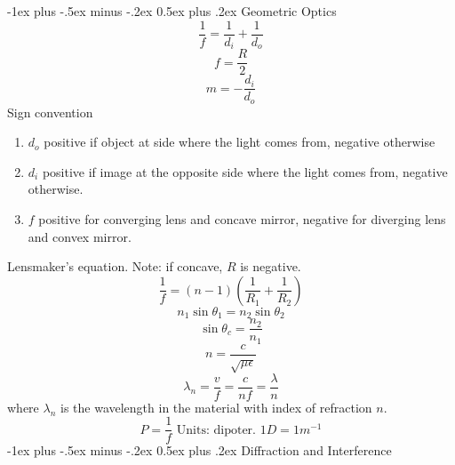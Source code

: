 \documentclass[12pt,landscape]{article}
\makeatletter
\renewcommand{\section}{\@startsection{section}{1}{0mm}%
                                {-1ex plus -.5ex minus -.2ex}%
                                {0.5ex plus .2ex}%
                                {\normalfont\large\bfseries}}
\makeatother
\begin{document}
\begin{multicols}{4}
    \newpage

    \section{Geometric Optics}
    \begin{equation*}
        \frac{1}{f} = \frac{1}{d_i} + \frac{1}{d_o}
    \end{equation*}
    \begin{equation*}
        f = \frac{R}{2}
    \end{equation*}
    \begin{equation*}
        m = -\frac{d_i}{d_o}
    \end{equation*}
    Sign convention
    \begin{enumerate}
        \item $d_o$ positive if object at side where the light comes from, negative otherwise
        \item $d_i$ positive if image at the opposite side where the light comes from, negative otherwise.
        \item $f$ positive for converging lens and concave mirror, negative for diverging lens and convex mirror.
    \end{enumerate}
    Lensmaker's equation. Note: if concave, $R$ is negative.
    \begin{equation*}
        \frac{1}{f} = (n - 1) \left(\frac{1}{R_1} + \frac{1}{R_2}\right)
    \end{equation*}
    \begin{equation*}
        n_1 \sin\theta_1 = n_2 \sin \theta_2
    \end{equation*}
    \begin{equation*}
        \sin \theta_c = \frac{n_2}{n_1}
    \end{equation*}
    \begin{equation*}
        n = \frac{c}{\sqrt{\mu \epsilon}}
    \end{equation*}
    \begin{equation*}
        \lambda_n = \frac{v}{f} = \frac{c}{nf} = \frac{\lambda}{n}
    \end{equation*}
    where $\lambda_n$ is the wavelength in the material with index of refraction $n$.
    \begin{equation*}
        P = \frac{1}{f} \text{ Units: dipoter. $1 D = 1 m^{-1}$}
    \end{equation*}
    \section{Diffraction and Interference}

\end{multicols}
\end{document}
